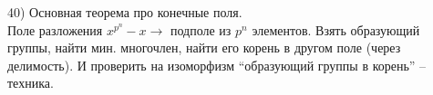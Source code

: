 40) Основная теорема про конечные поля.\\
Поле разложения $x^{p^n} - x \to$ подполе из $p^n$ элементов. Взять образующий группы, найти мин. многочлен, найти его корень в другом поле (через делимость). И проверить на изоморфизм ``образующий группы в корень'' -- техника.\\
